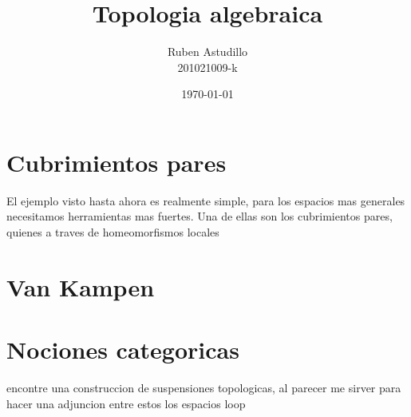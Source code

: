 \documentclass[letterpaper]{article}
\theoremstyle{definition}
\theoremstyle{plain}
\theoremstyle{plain}
\theoremstyle{remark}
\begin{document}
\title{Topologia algebraica}
\author{Ruben Astudillo \\ 201021009-k}
\date{\today}
\maketitle




\section{Cubrimientos pares}
El ejemplo visto hasta ahora es realmente simple, para los espacios mas
generales necesitamos herramientas mas fuertes. Una de ellas son los
cubrimientos pares, quienes a traves de homeomorfismos locales
\section{Van Kampen}

\section{Nociones categoricas}
encontre una construccion de suspensiones topologicas, al parecer me
sirver para hacer una adjuncion entre estos los espacios loop
\end{document}
